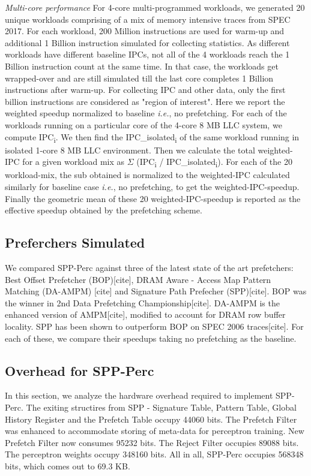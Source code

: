 \documentclass{sig-alternate}
\begin{document}
\textit{Multi-core performance} For 4-core multi-programmed workloads, we generated 20 unique workloads comprising of a mix of memory intensive traces from SPEC 2017. For each workload, 200 Million instructions are used for warm-up and additional 1 Billion instruction simulated for collecting statistics. As different workloads have different baseline IPCs, not all of the 4 workloads reach the 1 Billion instruction count at the same time. In that case, the workloads get wrapped-over and are still simulated till the last core completes 1 Billion instructions after warm-up. For collecting IPC and other data, only the first billion instructions are considered as "region of interest". Here we report the weighted speedup normalized to baseline \textit{i.e.}, no prefetching. For each of the workloads running on a particular core of the 4-core 8 MB LLC system, we compute IPC\textsubscript{i}. We then find the IPC\_isolated\textsubscript{i} of the same workload running in isolated 1-core 8 MB LLC environment. Then we calculate the total weighted-IPC for a given workload mix as $\Sigma$ (IPC\textsubscript{i} / IPC\_isolated\textsubscript{i}). For each of the 20 workload-mix, the sub obtained is normalized to the weighted-IPC calculated similarly for baseline case \textit{i.e.}, no prefetching, to get the weighted-IPC-speedup. Finally the geometric mean of these 20 weighted-IPC-speedup is reported as the effective speedup obtained by the prefetching scheme.

\subsection{Preferchers Simulated}
We compared SPP-Perc against three of the latest state of the art prefetchers: Best Offset Prefetcher (BOP)[cite], DRAM Aware - Access Map Pattern Matching (DA-AMPM) [cite] and Signature Path Prefecher (SPP)[cite]. BOP was the winner in 2nd Data Prefetching Championship[cite]. DA-AMPM is the enhanced version of AMPM[cite], modified to account for DRAM row buffer locality. SPP has been shown to outperform BOP on SPEC 2006 traces[cite]. For each of these, we compare their speedups taking no prefetching as the baseline.


\subsection{Overhead for SPP-Perc}
In this section, we analyze the hardware overhead required to implement SPP-Perc. The exiting structires from SPP - Signature Table, Pattern Table, Global History Register and the Prefetch Table occupy 44060 bits. The Prefetch Filter was enhanced to accommodate storing of meta-data for perceptron training. New Prefetch Filter now consumes 95232 bits. The Reject Filter occupies 89088 bits. The perceptron weights occupy 348160 bits. All in all, SPP-Perc occupies 568348 bits, which comes out to 69.3 KB. 
\end{document}
